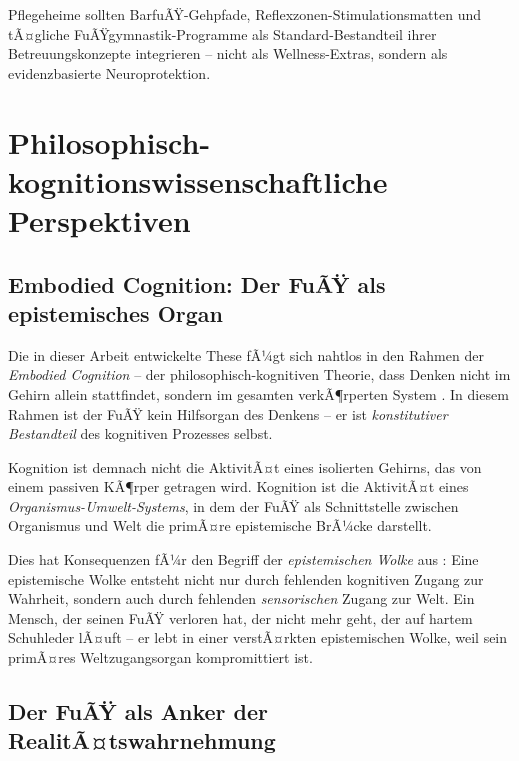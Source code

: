 ﻿\documentclass[12pt,a4paper]{report}
\theoremstyle{plain}
\theoremstyle{definition}
\theoremstyle{remark}
\begin{document}
Pflegeheime sollten BarfuÃŸ-Gehpfade, Reflexzonen-Stimulationsmatten
und tÃ¤gliche FuÃŸg\-ymnastik-Programme als Standard-Bestandteil
ihrer Betreuungskonzepte integrieren -- nicht als Wellness-Extras,
sondern als evidenzbasierte Neuroprotektion.

\section{Philosophisch-kognitionswissenschaftliche Perspektiven}

\subsection{Embodied Cognition: Der FuÃŸ als epistemisches Organ}

Die in dieser Arbeit entwickelte These fÃ¼gt sich nahtlos in den
Rahmen der \emph{Embodied Cognition} -- der philosophisch-kognitiven
Theorie, dass Denken nicht im Gehirn allein stattfindet, sondern
im gesamten verkÃ¶rperten System \cite{barsalou2008}. In diesem
Rahmen ist der FuÃŸ kein Hilfsorgan des Denkens -- er ist
\emph{konstitutiver Bestandteil} des kognitiven Prozesses selbst.

Kognition ist demnach nicht die AktivitÃ¤t eines isolierten
Gehirns, das von einem passiven KÃ¶rper getragen wird. Kognition
ist die AktivitÃ¤t eines \emph{Organismus-Umwelt-Systems}, in dem
der FuÃŸ als Schnittstelle zwischen Organismus und Welt die
primÃ¤re epistemische BrÃ¼cke darstellt.

Dies hat Konsequenzen fÃ¼r den Begriff der \emph{epistemischen
Wolke} aus \cite{epp2026brn}: Eine epistemische Wolke entsteht
nicht nur durch fehlenden kognitiven Zugang zur Wahrheit,
sondern auch durch fehlenden \emph{sensorischen} Zugang zur Welt.
Ein Mensch, der seinen FuÃŸ verloren hat, der nicht mehr geht,
der auf hartem Schuhleder lÃ¤uft -- er lebt in einer verstÃ¤rkten
epistemischen Wolke, weil sein primÃ¤res Weltzugangsorgan
kompromittiert ist.

\subsection{Der FuÃŸ als Anker der RealitÃ¤tswahrnehmung}
\end{document}
